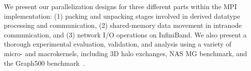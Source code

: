We present our parallelization designs for three different parts
within the MPI implementation: (1) packing and unpacking stages
involved in derived datatype processing and communication, (2)
shared-memory data movement in intranode communication, and (3)
network I/O operations on InfiniBand.  We also present a thorough
experimental evaluation, validation, and analysis using a variety of
micro- and macrokernels, including 3D halo exchanges, NAS MG
benchmark, and the Graph500 benchmark~\cite{graph500}.
